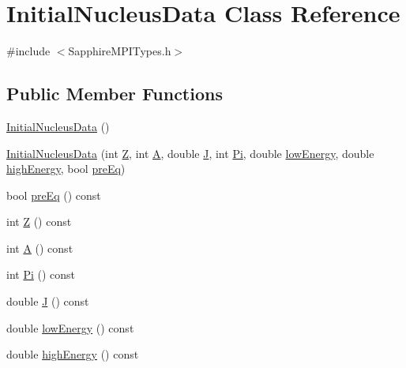 \hypertarget{classInitialNucleusData}{\section{Initial\-Nucleus\-Data Class Reference}
\label{classInitialNucleusData}
}


{\ttfamily \#include $<$Sapphire\-M\-P\-I\-Types.\-h$>$}

\subsection*{Public Member Functions}
\begin{DoxyCompactItemize}
\item 
\hyperlink{classInitialNucleusData_a8654c0d1ade76565b56a6623b6629307}{Initial\-Nucleus\-Data} ()
\item 
\hyperlink{classInitialNucleusData_a4b2b8485eb4c335278c39ed77bd02487}{Initial\-Nucleus\-Data} (int \hyperlink{classInitialNucleusData_a1ee1ed6bc4ea256f93bfd9bd9a0b96c6}{Z}, int \hyperlink{classInitialNucleusData_a4dec3fe9a44e5142de89c28bef45dbe0}{A}, double \hyperlink{classInitialNucleusData_ae2400790c869bdea1e1f79619dff7157}{J}, int \hyperlink{classInitialNucleusData_ad63e3dad51fa52a88477b97437841628}{Pi}, double \hyperlink{classInitialNucleusData_abe498b5aadeb835836cf7be4211ba227}{low\-Energy}, double \hyperlink{classInitialNucleusData_ab4ce2ac971e5c34748bdb826ec42d121}{high\-Energy}, bool \hyperlink{classInitialNucleusData_a15b4c0e140550e3c4be67b615a832cfa}{pre\-Eq})
\item 
bool \hyperlink{classInitialNucleusData_a15b4c0e140550e3c4be67b615a832cfa}{pre\-Eq} () const 
\item 
int \hyperlink{classInitialNucleusData_a1ee1ed6bc4ea256f93bfd9bd9a0b96c6}{Z} () const 
\item 
int \hyperlink{classInitialNucleusData_a4dec3fe9a44e5142de89c28bef45dbe0}{A} () const 
\item 
int \hyperlink{classInitialNucleusData_ad63e3dad51fa52a88477b97437841628}{Pi} () const 
\item 
double \hyperlink{classInitialNucleusData_ae2400790c869bdea1e1f79619dff7157}{J} () const 
\item 
double \hyperlink{classInitialNucleusData_abe498b5aadeb835836cf7be4211ba227}{low\-Energy} () const 
\item 
double \hyperlink{classInitialNucleusData_ab4ce2ac971e5c34748bdb826ec42d121}{high\-Energy} () const 
\end{DoxyCompactItemize}
